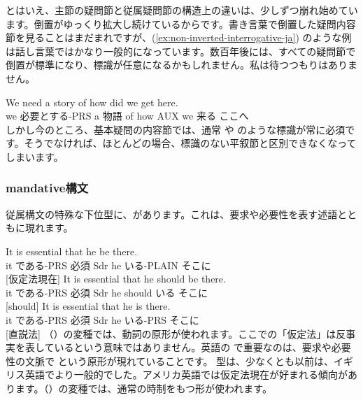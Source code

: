 とはいえ、主節の疑問節と従属疑問節の構造上の違いは、少しずつ崩れ始めています。倒置がゆっくり拡大し続けているからです。書き言葉で倒置した疑問内容節を見ることはまだまれですが、(\ref{ex:non-inverted-interrogative-ja}) のような例は話し言葉ではかなり一般的になっています。数百年後には、すべての疑問節で倒置が標準になり、標識が任意になるかもしれません。私は待つつもりはありません。

\ea\label{ex:non-inverted-interrogative-ja}
\gll We need a story of {\ob}how did we get here{\cb}.\\
    we 必要とする-PRS a 物語 of how AUX we 来る ここへ\\
\glt {}
\z
しかし今のところ、基本疑問の内容節では、通常  や  のような標識が常に必須です。そうでなければ、ほとんどの場合、標識のない平叙節と区別できなくなってしまいます。

\subsubsection*{mandative構文}

従属構文の特殊な下位型に、があります。これは、要求や必要性を表す述語とともに現れます。

\ea \label{ex:mandative-ja}
    \ea \gll It is essential {\ob}that he be there{\cb}.\\
        it である-PRS 必須 Sdr he いる-PLAIN そこに\\
    \glt {} [仮定法現在]
    \ex \gll It is essential {\ob}that he should be there{\cb}.\\
        it である-PRS 必須 Sdr he should いる そこに\\
    \glt {} [should]
    \ex \gll It is essential {\ob}that he is there{\cb}.\\
        it である-PRS 必須 Sdr he いる-PRS そこに\\
    \glt {} [直説法]
    \z
\z
{}（）の変種では、動詞の原形が使われます。ここでの「仮定法」は反事実を表しているという意味ではありません。英語の  で重要なのは、要求や必要性の文脈で  という原形が現れていることです。 型は、少なくとも以前は、イギリス英語でより一般的でした。アメリカ英語では仮定法現在が好まれる傾向があります。（）の変種では、通常の時制をもつ形が使われます。


